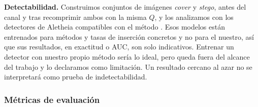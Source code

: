 \documentclass[IB]{TFUOC}%
\begin{document}
\textbf{Detectabilidad.} Construimos conjuntos de imágenes \textit{cover} y \textit{stego}, antes del canal y tras recomprimir ambos con la misma $Q$, y los analizamos con los detectores de Aletheia compatibles con el método \cite{1}. Esos modelos están entrenados para métodos y tasas de inserción concretos y no para el nuestro, así que sus resultados, en exactitud o AUC, son solo indicativos. Entrenar un detector con nuestro propio método sería lo ideal, pero queda fuera del alcance del trabajo y lo declaramos como limitación. Un resultado cercano al azar no se interpretará como prueba de indetectabilidad.

\subsubsection{Métricas de evaluación}
\end{document}
